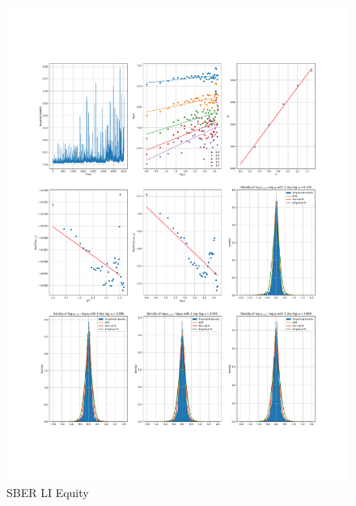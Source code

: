    \begin{figure}[h]
        \includegraphics[width=\textwidth]{fig/SBER LI Equity.pdf}
        \caption{SBER LI Equity}
    \end{figure} 

